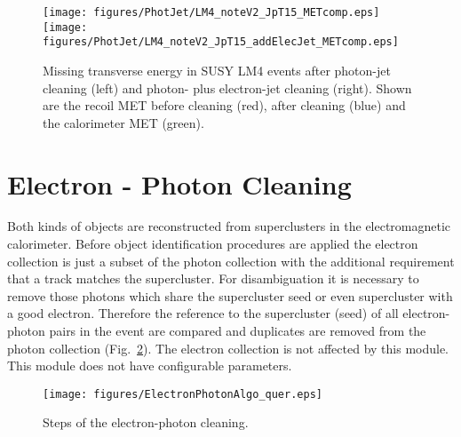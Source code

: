 \documentclass{cmspaper}
\begin{document}
\begin{figure}[hbtp]
  \begin{center}
      \texttt{[image: figures/PhotJet/LM4\_noteV2\_JpT15\_METcomp.eps]}
      \texttt{[image: figures/PhotJet/LM4\_noteV2\_JpT15\_addElecJet\_METcomp.eps]}
    \caption{Missing transverse energy in SUSY LM4 events after photon-jet
    cleaning (left) and photon- plus electron-jet cleaning (right). Shown are
    the recoil MET before cleaning (red), after cleaning (blue) and the
    calorimeter MET (green).}
    \label{fig:pjLM4MET}
  \end{center}
\end{figure}



\clearpage
\section{Electron - Photon Cleaning}
Both kinds of objects are reconstructed from superclusters in the
electromagnetic calorimeter. Before object identification procedures are
applied the electron collection is just a subset of the photon collection with
the additional requirement that a track matches the supercluster. For
disambiguation it is necessary to remove those photons which share the
supercluster seed or even supercluster with a good electron.  Therefore the
reference to the supercluster (seed) of all electron-photon pairs in the event
are compared and duplicates are removed from the photon collection
(Fig.~\ref{fig:EPCleaning}). The electron collection is not affected by this
module. This module does not have configurable parameters.

\begin{figure}[hbt]
\begin{center}
\texttt{[image: figures/ElectronPhotonAlgo\_quer.eps]}
\caption{Steps of the electron-photon cleaning.}
\label{fig:EPCleaning}
\end{center}
\end{figure}

\end{document}
